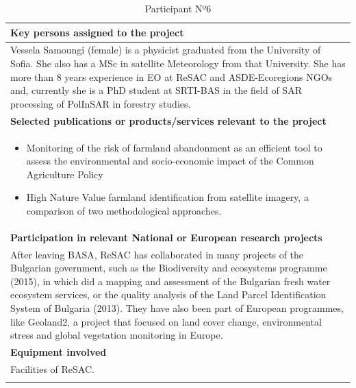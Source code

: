 \begin{longtable}[H]{|p{0.7cm}|p{4cm}|p{7cm}|p{1.3cm}|}
	\multicolumn{4}{|p{13cm}|}{\textbf{Key persons assigned to the project}}   \\ \hline
	
	\multicolumn{4}{|p{14.5cm}|}{Vessela Samoungi (female) is a physicist graduated from the University of Sofia. She also has a MSc in satellite Meteorology from that University. She has more than 8 years experience in EO at ReSAC and ASDE-Ecoregions NGOs and, currently she is a PhD student at SRTI-BAS in the field of SAR processing of PolInSAR in forestry studies.}  \\ \hline
	
	\multicolumn{4}{|p{13cm}|}{\textbf{Selected publications or products/services relevant to the project}}  \\ \hline
	
	\multicolumn{4}{|p{14.5cm}|}{
		\begin{itemize}
			\item  Monitoring of the risk of farmland abandonment as an efficient tool to assess the environmental and socio-economic impact of the Common Agriculture Policy
			\item High Nature Value farmland identification from satellite imagery, a comparison of two methodological approaches.
		\end{itemize}	
      }  \\ \hline
	
	\multicolumn{4}{|p{13cm}|}{\textbf{Participation in relevant National or European research projects}}  \\ \hline
	
	\multicolumn{4}{|p{14.5cm}|}{After leaving BASA, ReSAC has collaborated in many projects of the Bulgarian government, such as the Biodiversity and ecosystems programme (2015), in which did a mapping and assessment of the Bulgarian fresh water ecosystem services, or the quality analysis of the Land Parcel Identification System of Bulgaria (2013). They have also been part of European programmes, like Geoland2, a project that focused on land cover change, environmental stress and global vegetation monitoring in Europe.}  \\ \hline
	
	\multicolumn{4}{|p{13cm}|}{\textbf{Equipment involved}}  \\ \hline
	
	\multicolumn{4}{|p{14.5cm}|}{Facilities of ReSAC.}  \\ \hline
	\caption{Participant Nº6}
\end{longtable}



